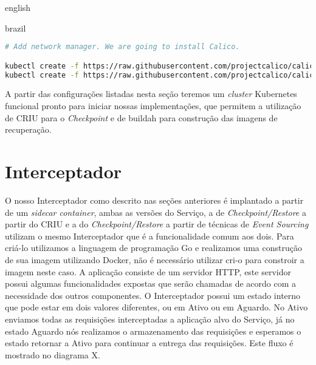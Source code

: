 \begin{otherlanguage*}{english}
\begin{otherlanguage*}{brazil}
\begin{lstlisting}[language=bash,caption={Inicialização do Kubernetes, configuração de acesso para o kubectl e instalação do administrador de rede para Pods Calico.},label={listing:kubernetes-conf}]
# Add network manager. We are going to install Calico.

kubectl create -f https://raw.githubusercontent.com/projectcalico/calico/v3.26.1/manifests/tigera-operator.yaml
kubectl create -f https://raw.githubusercontent.com/projectcalico/calico/v3.26.1/manifests/custom-resources.yaml
\end{lstlisting}

A partir das configurações listadas nesta seção teremos um \textit{cluster} Kubernetes funcional
pronto para iniciar nossas implementações, que permitem a utilização de CRIU para o \textit{Checkpoint}
e de buildah para construção das imagens de recuperação.

\section{Interceptador}

O nosso Interceptador como descrito nas seções anteriores é implantado a partir de um
\textit{sidecar container}, ambas as versões do Serviço, a de \textit{Checkpoint/Restore}
a partir do CRIU e a do \textit{Checkpoint/Restore} a partir de técnicas de
\textit{Event Sourcing} utilizam o mesmo Interceptador que é a funcionalidade comum aos
dois. Para criá-lo utilizamos a linguagem de programação Go e
realizamos uma construção de sua imagem utilizando Docker, não é necessário utilizar
cri-o para constroir a imagem neste caso. A aplicação consiste de um servidor HTTP,
este servidor possui algumas funcionalidades expostas que serão chamadas de acordo com
a necessidade dos outros componentes. O Interceptador possui um estado interno que pode
estar em dois valores diferentes, ou em Ativo ou em Aguardo. No Ativo enviamos todas
as requisições interceptadas a aplicação alvo do Serviço, já no estado Aguardo nós
realizamos o armazenamento das requisições e esperamos o estado retornar a Ativo para
continuar a entrega das requisições. Este fluxo é mostrado no diagrama X. %


\end{otherlanguage*}
\end{otherlanguage*}
